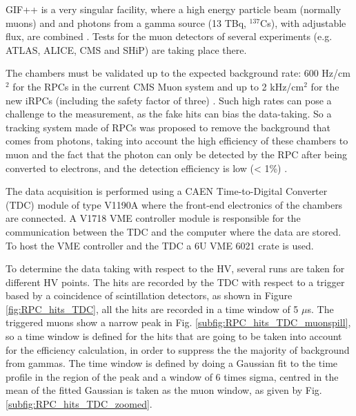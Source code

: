 GIF++ is a very singular facility, where a high energy particle beam (normally muons) and and photons from a gamma source (13 TBq, $^{137}$Cs), with adjustable flux, are combined \cite{guida2015gif++}. Tests for the muon detectors of several experiments (e.g. ATLAS, ALICE, CMS and SHiP) are taking place there.

The chambers must be validated up to the expected background rate: 600 Hz/cm$^2$ for the RPCs in the current CMS Muon system and up to 2 kHz/cm$^2$ for the new iRPCs (including the safety factor of three) \cite{CERN-LHCC-2017-012}. Such high rates can pose a challenge to the measurement, as the fake hits can bias the data-taking. So a tracking system made of RPCs was proposed to remove the background that comes from photons, taking into account the high efficiency of these chambers to muon and the fact that the photon can only be detected by the RPC after being converted to electrons, and the detection efficiency is low (< 1\%) \cite{Weizheng:2014ifa}.

The data acquisition is performed using a CAEN Time-to-Digital Converter (TDC) module of type V1190A where the front-end electronics of the chambers are connected. A V1718 VME controller module is responsible for the communication between the TDC and the computer where the data are stored. To host the VME controller and the TDC a 6U VME 6021 crate is used.

To determine the data taking with respect to the HV, several runs are taken for different HV points. The hits are recorded by the TDC with respect to a trigger based by a coincidence of scintillation detectors, as shown in Figure \ref{fig:RPC_hits_TDC}, all the hits are recorded in a time window of 5 $\mu$s. The triggered muons show a narrow peak in Fig. \ref{subfig:RPC_hits_TDC_muonspill}, so a time window is defined for the hits that are going to be taken into account for the efficiency calculation, in order to suppress the the majority of background from gammas. The time window is defined by doing a Gaussian fit to the time profile in the region of the peak and a window of 6 times sigma, centred in the mean of the fitted Gaussian is taken as the muon window, as given by Fig. \ref{subfig:RPC_hits_TDC_zoomed}.

